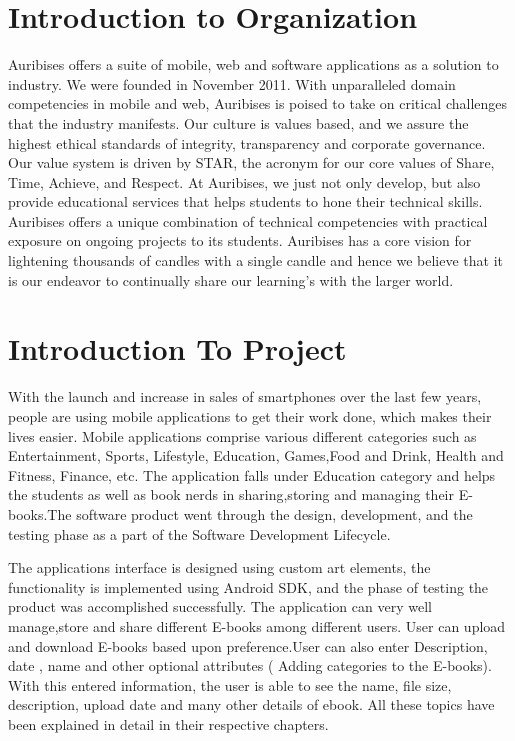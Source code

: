 \section{Introduction to Organization}

Auribises offers a suite of mobile, web and software applications as a solution to industry. 
We were founded in November 2011. With unparalleled domain competencies in mobile and web, Auribises is poised to take on critical challenges that the industry manifests. Our culture is values based, and we assure the highest ethical standards of integrity, transparency and corporate governance. Our value system is driven by STAR, the acronym for our core values of Share, Time, Achieve, and Respect. At Auribises, we just not only develop, but also provide educational services that helps students to hone their technical skills. Auribises offers a unique combination of technical competencies with practical exposure on ongoing projects to its students. Auribises has a core vision for lightening thousands of candles with a single candle and hence we believe that it is our endeavor to continually share our learning’s with the larger world.

\section{Introduction To Project} 
With the launch and increase in sales of smartphones over the last few years, people are using
mobile applications to get their work done, which makes their lives easier. Mobile applications
comprise various different categories such as Entertainment, Sports, Lifestyle, Education, Games,Food and Drink, Health and Fitness, Finance, etc. The application falls under Education category and helps the students as well as book nerds in sharing,storing and managing
their E-books.The software product went through the design, development, and the testing
phase as a part of the Software Development Lifecycle.

The applications interface is designed using custom art elements, the functionality is implemented using Android SDK, and the phase of testing the product was accomplished successfully. The application can very well manage,store and share different E-books among different users. User can upload and download E-books based upon preference.User can also enter
Description, date , name  and other optional attributes ( Adding categories  to the E-books). With this entered information, the user is able to see the name, file size, description, upload date and many other details of ebook. All these topics have been explained in detail in their respective chapters.

